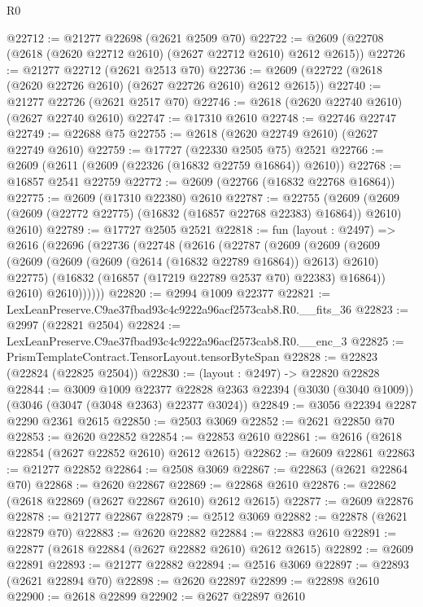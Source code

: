 \begin{lexlean}{R0}
\begin{coremodule}
@22712 := @21277 @22698 (@2621 @2509 @70)
@22722 := @2609 (@22708 (@2618 (@2620 @22712 @2610) (@2627 @22712 @2610) @2612 @2615))
@22726 := @21277 @22712 (@2621 @2513 @70)
@22736 := @2609 (@22722 (@2618 (@2620 @22726 @2610) (@2627 @22726 @2610) @2612 @2615))
@22740 := @21277 @22726 (@2621 @2517 @70)
@22746 := @2618 (@2620 @22740 @2610) (@2627 @22740 @2610)
@22747 := @17310 @2610
@22748 := @22746 @22747
@22749 := @22688 @75
@22755 := @2618 (@2620 @22749 @2610) (@2627 @22749 @2610)
@22759 := @17727 (@22330 @2505 @75) @2521
@22766 := @2609 (@2611 (@2609 (@22326 (@16832 @22759 @16864)) @2610))
@22768 := @16857 @2541 @22759
@22772 := @2609 (@22766 (@16832 @22768 @16864))
@22775 := @2609 (@17310 @22380) @2610
@22787 := @22755
    (@2609 (@2609 (@2609 (@22772 @22775) (@16832 (@16857 @22768 @22383) @16864)) @2610) @2610)
@22789 := @17727 @2505 @2521
@22818 := fun (layout : @2497) =>
  @2616
    (@22696
      (@22736
        (@22748
          (@2616
            (@22787
              (@2609
                (@2609
                  (@2609
                    (@2609 (@2609 (@2609 (@2614 (@16832 @22789 @16864)) @2613) @2610) @22775)
                    (@16832 (@16857 (@17219 @22789 @2537 @70) @22383) @16864))
                  @2610)
                @2610))))))
@22820 := @2994 @1009 @22377
@22821 := LexLeanPreserve.C9ae37fbad93c4c9222a96acf2573cab8.R0.__fits_36
@22823 := @2997 (@22821 @2504)
@22824 := LexLeanPreserve.C9ae37fbad93c4c9222a96acf2573cab8.R0.__enc_3
@22825 := PrismTemplateContract.TensorLayout.tensorByteSpan
@22828 := @22823 (@22824 (@22825 @2504))
@22830 := (layout : @2497) -> @22820 @22828
@22844 := @3009
    @1009
    @22377
    @22828
    @2363
    @22394
    (@3030 (@3040 @1009))
    (@3046 (@3047 (@3048 @2363) @22377 @3024))
@22849 := @3056 @22394 @2287 @2290 @2361 @2615
@22850 := @2503 @3069
@22852 := @2621 @22850 @70
@22853 := @2620 @22852
@22854 := @22853 @2610
@22861 := @2616 (@2618 @22854 (@2627 @22852 @2610) @2612 @2615)
@22862 := @2609 @22861
@22863 := @21277 @22852
@22864 := @2508 @3069
@22867 := @22863 (@2621 @22864 @70)
@22868 := @2620 @22867
@22869 := @22868 @2610
@22876 := @22862 (@2618 @22869 (@2627 @22867 @2610) @2612 @2615)
@22877 := @2609 @22876
@22878 := @21277 @22867
@22879 := @2512 @3069
@22882 := @22878 (@2621 @22879 @70)
@22883 := @2620 @22882
@22884 := @22883 @2610
@22891 := @22877 (@2618 @22884 (@2627 @22882 @2610) @2612 @2615)
@22892 := @2609 @22891
@22893 := @21277 @22882
@22894 := @2516 @3069
@22897 := @22893 (@2621 @22894 @70)
@22898 := @2620 @22897
@22899 := @22898 @2610
@22900 := @2618 @22899
@22902 := @2627 @22897 @2610

\end{coremodule}
\end{lexlean}

